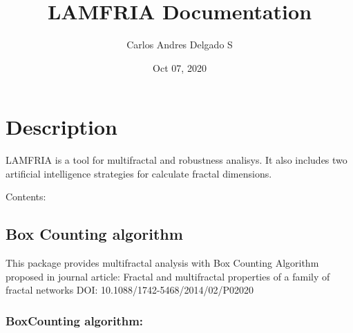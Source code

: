 \documentclass[letterpaper,10pt,english]{sphinxmanual}
\title{LAMFRIA Documentation}
\date{Oct 07, 2020}
\author{Carlos Andres Delgado S}
\begin{document}
\pagestyle{empty}
\sphinxmaketitle
\pagestyle{plain}
\sphinxtableofcontents
\pagestyle{normal}
\label{\detokenize{index::doc}}



\chapter{Description}
\label{\detokenize{index:description}}
LAMFRIA is a tool for multifractal and robustness analisys. It also includes two artificial intelligence strategies for calculate fractal dimensions.

Contents:


\section{Box Counting algorithm}
\label{\detokenize{BCAlgorithm:box-counting-algorithm}}\label{\detokenize{BCAlgorithm::doc}}
This package provides multifractal analysis with Box Counting Algorithm proposed in journal article: Fractal and multifractal properties of a family of fractal networks DOI: 10.1088/1742-5468/2014/02/P02020


\subsection{BoxCounting algorithm:}
\label{\detokenize{BCAlgorithm:module-BCAlgorithm.BCAlgorithm}}\label{\detokenize{BCAlgorithm:boxcounting-algorithm}}
\end{document}
